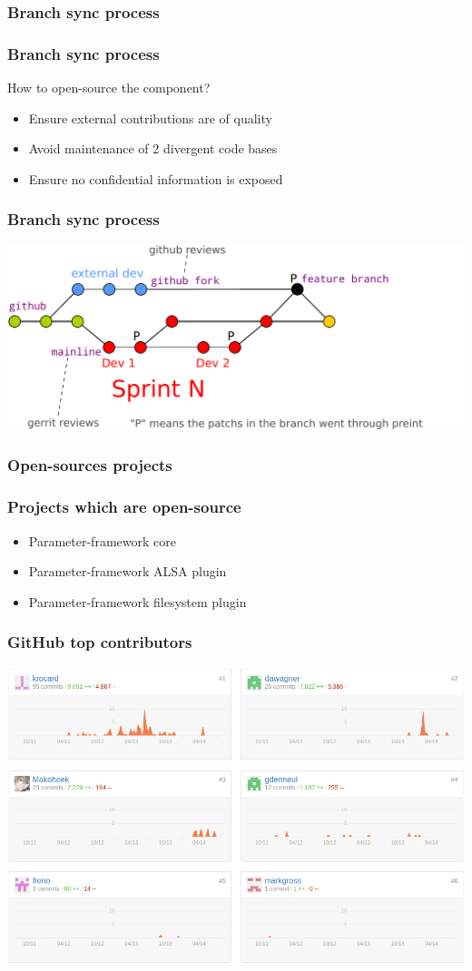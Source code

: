\subsubsection{Branch sync process}
\begin{frame}
    \frametitle{Branch sync process}
    \begin{block}{How to open-source the component?}
        \begin{itemize}
            \item Ensure external contributions are of quality
            \item Avoid maintenance of 2 divergent code bases
            \item Ensure no confidential information is exposed
        \end{itemize}
    \end{block}
\end{frame}

\begin{frame}
    \frametitle{Branch sync process}
    \centering
    \includegraphics[width=\textwidth]{../../report/src/img/branches-process.pdf}
\end{frame}

\subsubsection{Open-sources projects}
\begin{frame}
    \frametitle{Projects which are open-source}
    \begin{itemize}
        \item Parameter-framework core
        \item Parameter-framework ALSA plugin
        \item Parameter-framework filesystem plugin
    \end{itemize}
\end{frame}

\begin{frame}
    \frametitle{GitHub top contributors}
    \centering
    \includegraphics[width=\textwidth]{../../report/src/img/statsGitHub.png}
\end{frame}

